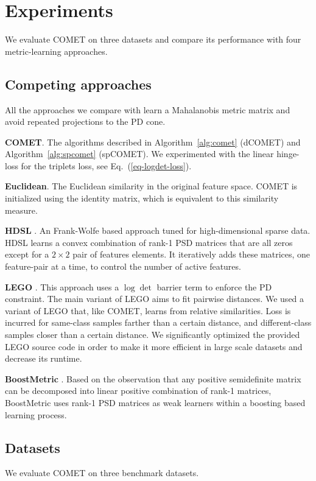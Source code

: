 \documentclass[twoside,11pt]{article}
\renewcommand{\eqref}[1]{Eq.~(\ref{#1})}
\begin{document}

\section{Experiments}
We evaluate COMET on three datasets and compare its performance with four metric-learning approaches. 

\subsection{Competing approaches}
All the approaches we compare with learn a Mahalanobis metric matrix and avoid repeated projections to the PD cone.

\textbf{COMET}. The algorithms described in Algorithm~\ref{alg:comet} (dCOMET) and Algorithm~\ref{alg:spcomet} (spCOMET). We experimented with the linear hinge-loss for the triplets loss, see \eqref{eq-logdet-loss}.

\textbf{Euclidean}. The Euclidean similarity in the original feature space. COMET is initialized using the identity matrix, which is equivalent to this similarity measure.

\textbf{HDSL} \citep{hdsl}. An Frank-Wolfe based approach tuned for high-dimensional sparse data. HDSL learns a convex combination of rank-1 PSD matrices that are all zeros except for a $2\times2$ pair of features elements. It iteratively adds these matrices, one feature-pair at a time, to control the number of active features.

\textbf{LEGO} \citep{lego}. This approach uses a $\log \det$ barrier term to enforce the PD constraint. The main variant of LEGO aims to fit pairwise distances. We used a variant of LEGO that, like COMET, learns from relative similarities. Loss is incurred for same-class samples farther than a certain distance, and different-class samples closer than a certain distance. We significantly optimized the provided LEGO source code in order to make it more efficient in large scale datasets and decrease its runtime.

\noindent\textbf{BoostMetric} \citep{boost}. Based on the observation that any positive semidefinite matrix can be decomposed into linear positive combination of rank-1 matrices, BoostMetric uses rank-1 PSD matrices as weak learners within a boosting based learning process.

\subsection{Datasets}
We evaluate COMET on three benchmark datasets.
\end{document}

